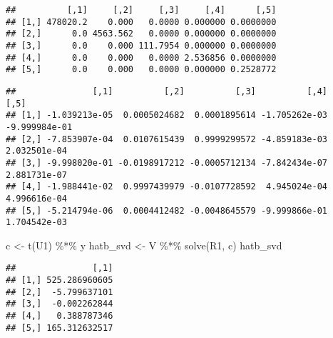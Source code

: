 \documentclass[
]{book}
\newenvironment{Shaded}{\begin{snugshade}}{\end{snugshade}}
\newcommand{\FunctionTok}[1]{\textcolor[rgb]{0.00,0.00,0.00}{#1}}
\newcommand{\NormalTok}[1]{#1}
\newcommand{\OtherTok}[1]{\textcolor[rgb]{0.56,0.35,0.01}{#1}}
\newcommand{\SpecialCharTok}[1]{\textcolor[rgb]{0.00,0.00,0.00}{#1}}
\begin{document}
\begin{Shaded}
\end{Shaded}

\begin{verbatim}
##          [,1]     [,2]     [,3]     [,4]      [,5]
## [1,] 478020.2    0.000   0.0000 0.000000 0.0000000
## [2,]      0.0 4563.562   0.0000 0.000000 0.0000000
## [3,]      0.0    0.000 111.7954 0.000000 0.0000000
## [4,]      0.0    0.000   0.0000 2.536856 0.0000000
## [5,]      0.0    0.000   0.0000 0.000000 0.2528772
\end{verbatim}

\begin{Shaded}
\end{Shaded}

\begin{verbatim}
##               [,1]          [,2]          [,3]          [,4]          [,5]
## [1,] -1.039213e-05  0.0005024682  0.0001895614 -1.705262e-03 -9.999984e-01
## [2,] -7.853907e-04  0.0107615439  0.9999299572 -4.859183e-03  2.032501e-04
## [3,] -9.998020e-01 -0.0198917212 -0.0005712134 -7.842434e-07  2.881731e-07
## [4,] -1.988441e-02  0.9997439979 -0.0107728592  4.945024e-04  4.996616e-04
## [5,] -5.214794e-06  0.0004412482 -0.0048645579 -9.999866e-01  1.704542e-03
\end{verbatim}

\begin{Shaded}
\begin{Highlighting}[]
\NormalTok{c }\OtherTok{\textless{}{-}} \FunctionTok{t}\NormalTok{(U1) }\SpecialCharTok{\%*\%}\NormalTok{ y}
\NormalTok{hatb\_svd }\OtherTok{\textless{}{-}}\NormalTok{ V }\SpecialCharTok{\%*\%} \FunctionTok{solve}\NormalTok{(R1, c)}
\NormalTok{hatb\_svd}
\end{Highlighting}
\end{Shaded}

\begin{verbatim}
##               [,1]
## [1,] 525.286960605
## [2,]  -5.799637101
## [3,]  -0.002262844
## [4,]   0.388787346
## [5,] 165.312632517
\end{verbatim}
\end{document}
